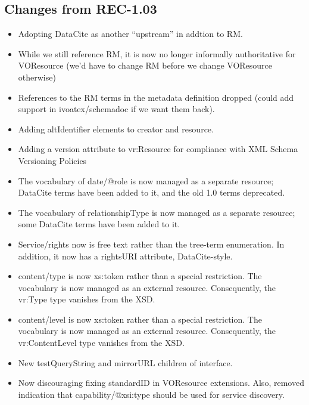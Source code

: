 \documentclass[11pt,a4paper]{ivoa}
\begin{document}
\subsection{Changes from REC-1.03}

\begin{itemize}
\item Adopting DataCite as another ``upstream'' in addtion to RM.

\item While we still reference RM, it is now no longer informally
authoritative for VOResource (we'd have to change RM before we change
VOResource otherwise)

\item References to the RM terms in the metadata definition dropped
(could add support in ivoatex/schemadoc if we want them back).

\item Adding altIdentifier elements to creator and resource.

\item Adding a version attribute to vr:Resource for compliance with XML
Schema Versioning Policies

\item The vocabulary of date/@role is now managed as a separate
resource; DataCite terms have been added to it, and the old 1.0 terms
deprecated.

\item The vocabulary of relationshipType is now managed as a separate
resource; some DataCite terms have been added to it.

\item Service/rights now is free text rather than the tree-term
enumeration.  In addition, it now has a rightsURI attribute,
DataCite-style.

\item content/type is now xs:token rather than a special restriction.
The vocabulary is now managed as an external resource.
Consequently, the vr:Type type vanishes from the XSD.

\item content/level is now xs:token rather than a special restriction.
The vocabulary is now managed as an external resource.
Consequently, the vr:ContentLevel type vanishes from the XSD.

\item New testQueryString and mirrorURL children of interface.

\item Now discouraging fixing standardID in VOResource extensions.
Also, removed indication that capability/@xsi:type should be used for
service discovery.


\end{itemize}
\end{document}
